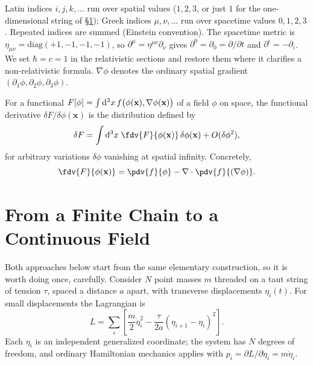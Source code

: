 Latin indices $i,j,k,\dots$ run over spatial values ($1,2,3$, or just $1$ for
the one-dimensional string of \S\ref{sec:continuum-limit}); Greek indices
$\mu,\nu,\dots$ run over spacetime values $0,1,2,3$. Repeated indices are
summed (Einstein convention). The spacetime metric is
$\eta_{\mu\nu}=\mathrm{diag}(+1,-1,-1,-1)$, so
$\partial^\mu=\eta^{\mu\nu}\partial_\nu$ gives
$\partial^0=\partial_0=\partial/\partial t$ and $\partial^i=-\partial_i$. We
set $\hbar=c=1$ in the relativistic sections and restore them where it
clarifies a non-relativistic formula. $\nabla\phi$ denotes the ordinary spatial
gradient $(\partial_1\phi,\partial_2\phi,\partial_3\phi)$.

\begin{definition}
\label{def:funcderiv}
For a functional $F[\phi]=\int \mathrm{d}^3x\,
    f\big(\phi(\mathbf{x}),\nabla\phi(\mathbf{x})\big)$ of a field $\phi$ on
    space, the functional derivative $\delta F/\delta\phi(\mathbf{x})$ is the
    distribution defined by
\begin{equation}
\delta F = \int \rd^3x\; \fdv{F}{\phi(\mathbf{x})}\,\delta\phi(\mathbf{x}) 
    + O(\delta\phi^2),
\end{equation}
for arbitrary variations $\delta\phi$ vanishing at spatial infinity. Concretely,
\begin{equation}
\fdv{F}{\phi(\mathbf{x})} = \pdv{f}{\phi} - \nabla\cdot\pdv{f}{(\nabla\phi)}.
\end{equation}
\end{definition}

\section{From a Finite Chain to a Continuous Field}
\label{sec:continuum-limit}

Both approaches below start from the same elementary construction, so it is
worth doing once, carefully. Consider $N$ point masses $m$ threaded on a taut
string of tension $\tau$, spaced a distance $a$ apart, with transverse
displacements $\eta_i(t)$. For small displacements the Lagrangian is
\begin{equation}
L = \sum_{i} \left[\frac{m}{2}\dot\eta_i^2 - 
    \frac{\tau}{2a}(\eta_{i+1}-\eta_i)^2\right].
\end{equation}
Each $\eta_i$ is an independent generalized coordinate; the system has $N$
degrees of freedom, and ordinary Hamiltonian mechanics applies with
$p_i=\partial L/\partial\dot\eta_i = m\dot\eta_i$.

